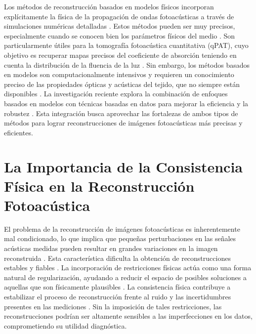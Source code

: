 Los métodos de reconstrucción basados en modelos físicos incorporan explícitamente la física de la propagación de ondas fotoacústicas a través de simulaciones numéricas detalladas \cite{recent_advances_2025a}. Estos métodos pueden ser muy precisos, especialmente cuando se conocen bien los parámetros físicos del medio \cite{recent_advances_2025a}. Son particularmente útiles para la tomografía fotoacústica cuantitativa (qPAT), cuyo objetivo es recuperar mapas precisos del coeficiente de absorción teniendo en cuenta la distribución de la fluencia de la luz \cite{quantitative_pat_2021}. Sin embargo, los métodos basados en modelos son computacionalmente intensivos y requieren un conocimiento preciso de las propiedades ópticas y acústicas del tejido, que no siempre están disponibles \cite{recent_advances_2025a}. La investigación reciente explora la combinación de enfoques basados en modelos con técnicas basadas en datos para mejorar la eficiencia y la robustez \cite{recent_advances_dl_2023}. Esta integración busca aprovechar las fortalezas de ambos tipos de métodos para lograr reconstrucciones de imágenes fotoacústicas más precisas y eficientes.

\section{La Importancia de la Consistencia Física en la Reconstrucción Fotoacústica}

El problema de la reconstrucción de imágenes fotoacústicas es inherentemente mal condicionado, lo que implica que pequeñas perturbaciones en las señales acústicas medidas pueden resultar en grandes variaciones en la imagen reconstruida \cite{recent_advances_2025a}. Esta característica dificulta la obtención de reconstrucciones estables y fiables \cite{resolution_enhancement_2024}. La incorporación de restricciones físicas actúa como una forma natural de regularización, ayudando a reducir el espacio de posibles soluciones a aquellas que son físicamente plausibles \cite{hauptmann_2024}. La consistencia física contribuye a estabilizar el proceso de reconstrucción frente al ruido y las incertidumbres presentes en las mediciones \cite{hauptmann_2024}. Sin la imposición de tales restricciones, las reconstrucciones podrían ser altamente sensibles a las imperfecciones en los datos, comprometiendo su utilidad diagnóstica.

